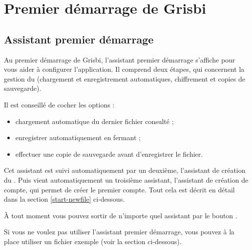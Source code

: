 

\chapter{Premier démarrage de Grisbi\label{start}}


\section{Assistant premier démarrage\label{start-first}}


Au premier démarrage de Grisbi, l'assistant premier démarrage s'affiche pour
vous aider à configurer l'application. Il comprend deux étapes, qui concernent
la gestion du  (chargement et enregistrement automatiques,
chiffrement et copies de sauvegarde).

Il est conseillé de cocher les options :

\begin{itemize}
 \item chargement automatique du dernier fichier consulté ;
 \item enregistrer automatiquement en fermant ;
 \item effectuer une copie de sauvegarde avant d'enregistrer le fichier.
\end{itemize}

Cet assistant est suivi automatiquement par un deuxième, l'assistant de création du . Puis vient automatiquement un troisième assistant, l'assistant de création de compte, qui permet de créer le premier compte. Tout cela est décrit en détail dans la section \ref{start-newfile} ci-dessous.

À tout moment vous pouvez sortir de n'importe quel assistant par le bouton .

Si vous ne voulez pas utiliser l'assistant premier démarrage, vous pouvez à la
place utiliser un fichier exemple (voir la section ci-dessous).


